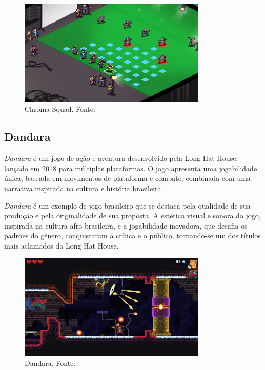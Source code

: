 \begin{figure}[H]
    \centering
    \includegraphics[width=0.8\textwidth]{figuras/Chroma Squad.jpg}
    \caption{Chroma Squad. Fonte: \cite{chromaSquad}}
    \label{fig:chroma-squad}
\end{figure}

\subsection{Dandara}
\textit{Dandara} é um jogo de ação e aventura desenvolvido pela Long Hat House, lançado em 2018 para múltiplas plataformas. O jogo apresenta uma jogabilidade única, baseada em movimentos de plataforma e combate, combinada com uma narrativa inspirada na cultura e história brasileira.

\textit{Dandara} é um exemplo de jogo brasileiro que se destaca pela qualidade de sua produção e pela originalidade de sua proposta. A estética visual e sonora do jogo, inspirada na cultura afro-brasileira, e a jogabilidade inovadora, que desafia os padrões do gênero, conquistaram a crítica e o público, tornando-se um dos títulos mais aclamados da Long Hat House.

\begin{figure}[H]
    \centering
    \includegraphics[width=0.8\textwidth]{figuras/Dandara.jpg}
    \caption{Dandara. Fonte: \cite{dandara}}
    \label{fig:dandara}
\end{figure}

